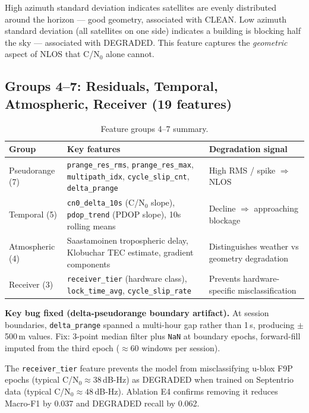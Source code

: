\documentclass[12pt,a4paper]{article}
\newcommand{\code}[1]{\texttt{#1}}
\begin{document}
High azimuth standard deviation indicates satellites are evenly distributed around the
horizon --- good geometry, associated with CLEAN.
Low azimuth standard deviation (all satellites on one side) indicates a building is
blocking half the sky --- associated with DEGRADED.
This feature captures the \emph{geometric} aspect of NLOS that C/N$_0$ alone cannot.

\subsection{Groups 4--7: Residuals, Temporal, Atmospheric, Receiver (19 features)}

\begin{table}[H]
  \centering
  \caption{Feature groups 4--7 summary.}
  \begin{tabular}{lp{6cm}l}
    \toprule
    \textbf{Group} & \textbf{Key features} & \textbf{Degradation signal} \\
    \midrule
    Pseudorange (7) &
      \code{prange\_res\_rms}, \code{prange\_res\_max}, \code{multipath\_idx},
      \code{cycle\_slip\_cnt}, \code{delta\_prange} &
      High RMS / spike $\Rightarrow$ NLOS \\
    Temporal (5) &
      \code{cn0\_delta\_10s} (C/N$_0$ slope), \code{pdop\_trend} (PDOP slope),
      10s rolling means &
      Decline $\Rightarrow$ approaching blockage \\
    Atmospheric (4) &
      Saastamoinen tropospheric delay, Klobuchar TEC estimate, gradient components &
      Distinguishes weather vs geometry degradation \\
    Receiver (3) &
      \code{receiver\_tier} (hardware class), \code{lock\_time\_avg},
      \code{cycle\_slip\_rate} &
      Prevents hardware-specific misclassification \\
    \bottomrule
  \end{tabular}
\end{table}

\textbf{Key bug fixed (delta-pseudorange boundary artifact).}
At session boundaries, \code{delta\_prange} spanned a multi-hour gap rather than 1\,s,
producing $\pm$500\,m values. Fix: 3-point median filter plus \code{NaN} at boundary
epochs, forward-fill imputed from the third epoch ($\approx$60 windows per session).

The \code{receiver\_tier} feature prevents the model from misclassifying u-blox
F9P epochs (typical C/N$_0 \approx 38$\,dB-Hz) as DEGRADED when trained on
Septentrio data (typical C/N$_0 \approx 48$\,dB-Hz). Ablation E4 confirms removing it
reduces Macro-F1 by 0.037 and DEGRADED recall by 0.062.
\end{document}

